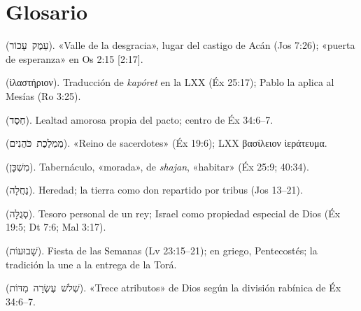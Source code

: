 \documentclass[11pt,letterpaper]{article}
\newcommand{\heb}[1]{\mbox{\foreignlanguage{hebrew}{#1}}}
\newcommand{\grc}[1]{\foreignlanguage{ancientgreek}{#1}}
\begin{document}
\section*{Glosario}
\begin{description}\small
\item[Émeq Ajor] (\heb{עֵמֶק עָכוֹר}). «Valle de la desgracia», lugar del castigo de Acán (Jos 7:26); «puerta de esperanza» en Os 2:15 [2:17].
\item[Hilastérion] (\grc{ἱλαστήριον}). Traducción de \emph{kapóret} en la LXX (Éx 25:17); Pablo la aplica al Mesías (Ro 3:25).
\item[Jésed] (\heb{חֶסֶד}). Lealtad amorosa propia del pacto; centro de Éx 34:6–7.
\item[Mamléjet kohaním] (\heb{מַמְלֶכֶת כֹּהֲנִים}). «Reino de sacerdotes» (Éx 19:6); LXX \grc{βασίλειον ἱεράτευμα}.
\item[Mishkán] (\heb{מִשְׁכָּן}). Tabernáculo, «morada», de \emph{shajan}, «habitar» (Éx 25:9; 40:34).
\item[Najalá] (\heb{נַחֲלָה}). Heredad; la tierra como don repartido por tribus (Jos 13–21).
\item[Segulá] (\heb{סְגֻלָּה}). Tesoro personal de un rey; Israel como propiedad especial de Dios (Éx 19:5; Dt 7:6; Mal 3:17).
\item[Shavuot] (\heb{שָׁבוּעוֹת}). Fiesta de las Semanas (Lv 23:15–21); en griego, Pentecostés; la tradición la une a la entrega de la Torá.
\item[Shelosh esré midot] (\heb{שְׁלֹשׁ עֶשְׂרֵה מִדּוֹת}). «Trece atributos» de Dios según la división rabínica de Éx 34:6–7.
\end{description}
\end{document}
